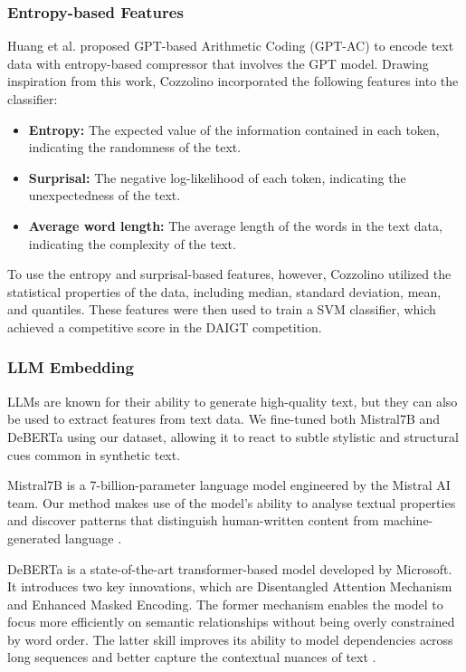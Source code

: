 \documentclass[conference]{IEEEtran}
\begin{document}
\subsubsection{Entropy-based Features}

Huang et al. \cite{huang2023gpt} proposed GPT-based Arithmetic Coding (GPT-AC) to encode text data with entropy-based compressor that involves the GPT model. Drawing inspiration from this work, Cozzolino \cite{6thplace} incorporated the following features into the classifier:
\begin{itemize}
  \item \textbf{Entropy:} The expected value of the information contained in each token, indicating the randomness of the text.
  \item \textbf{Surprisal:} The negative log-likelihood of each token, indicating the unexpectedness of the text.
  \item \textbf{Average word length:} The average length of the words in the text data, indicating the complexity of the text.
\end{itemize}

To use the entropy and surprisal-based features, however, Cozzolino utilized the statistical properties of the data, including median, standard deviation, mean, and quantiles. These features were then used to train a SVM classifier, which achieved a competitive score in the DAIGT competition.

\subsubsection{LLM Embedding}
\label{sec:llm_embedding}

LLMs are known for their ability to generate high-quality text, but they can also be used to extract features from text data. We fine-tuned both Mistral7B and DeBERTa using our dataset, allowing it to react to subtle stylistic and structural cues common in synthetic text.

Mistral7B is a 7-billion-parameter language model engineered by the Mistral AI team. Our method makes use of the model's ability to analyse textual properties and discover patterns that distinguish human-written content from machine-generated language \cite{mistral7b}.

DeBERTa is a state-of-the-art transformer-based model developed by Microsoft. It introduces two key innovations, which are Disentangled Attention Mechanism and Enhanced Masked Encoding. The former mechanism enables the model to focus more efficiently on semantic relationships without being overly constrained by word order. The latter skill improves its ability to model dependencies across long sequences and better capture the contextual nuances of text \cite{deberta}.
\end{document}

